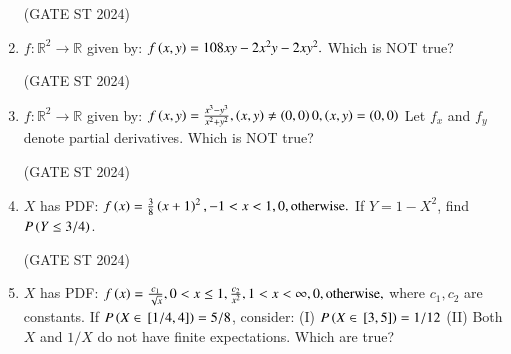 \documentclass[journal,12pt,onecolumn]{IEEEtran}
\theoremstyle{remark}
\begin{document}
\begin{enumerate}
\hfill (GATE ST 2024)
\item
$f:\mathbb{R}^2\to\mathbb{R}$ given by:
$
f\left(x,y\right) = 108xy - 2x^2y - 2xy^2.
$
Which is NOT true?

\begin{enumerate}
\end{enumerate}
\hfill (GATE ST 2024)
\item
$f:\mathbb{R}^2\to\mathbb{R}$ given by:
$
f\left(x,y\right) = 
\frac{x^3 - y^3}{x^2 + y^2},  \left(x,y\right) \neq \left(0,0\right) \\
0,  \left(x,y\right) = \left(0,0\right)
$
Let $f_x$ and $f_y$ denote partial derivatives. Which is NOT true?

\begin{enumerate}
\end{enumerate}
\hfill (GATE ST 2024)
\item
$X$ has PDF:
$
f\left(x\right) = 
\frac{3}{8}\left(x+1\right)^2,  -1 < x < 1, \\
0,  \text{otherwise}.
$
If $Y = 1 - X^2$, find $P\left(Y \le 3/4\right)$.

\begin{enumerate}
\end{enumerate}
\hfill (GATE ST 2024)
\item
$X$ has PDF:
$
f\left(x\right) = 
\frac{c_1}{\sqrt{x}},  0 < x \le 1, \\
\frac{c_2}{x^2},  1 < x < \infty, \\
0,  \text{otherwise},
$
where $c_1,c_2$ are constants. If $P\left(X \in {}\left[1/4, 4\right]\right) = 5/8$,  
consider:  
(I) $P\left(X \in {}\left[3,5\right]\right) = 1/12$  
(II) Both $X$ and $1/X$ do not have finite expectations.  
Which are true?


\end{enumerate}
\end{document}
